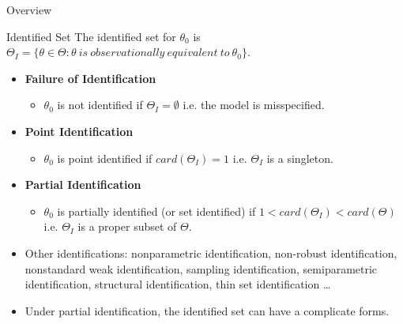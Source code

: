 \documentclass[aspectratio=169]{beamer}  %
\begin{document}
\begin{frame}{Overview}
    \begin{block}{Identified Set} The identified set for $\theta_0$ is $\Theta_I = \{\theta \in \Theta: \theta~is~observationally~equivalent~to~\theta_0\}$.
    \end{block}

    \begin{itemize}
        \item \textbf{Failure of Identification}
        \begin{itemize}
            \item $\theta_0$ is not identified if $\Theta_I = \emptyset$ i.e. the model is misspecified.
        \end{itemize}

        \item \textbf{Point Identification}
        \begin{itemize}
            \item $\theta_0$ is point identified if $card(\Theta_I)=1$ i.e. $\Theta_I$ is a singleton. 
        \end{itemize}

        \item \textbf{Partial Identification}
        \begin{itemize}
        \item  $\theta_0$ is partially identified (or set identified) if $1<card(\Theta_I)<card(\Theta)$ i.e. $\Theta_I$ is a proper subset of $\Theta$.
        \end{itemize}
        \item Other identifications: nonparametric identification, non-robust identification, nonstandard weak identification, sampling identification, semiparametric identification, structural identification, thin set identification \ldots
        \item Under partial identification, the identified set can have a complicate
        forms.
    \end{itemize}

\end{frame}
\end{document}
